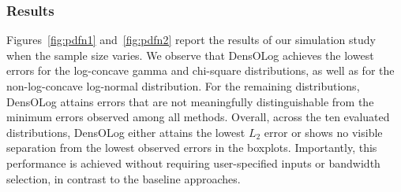 \documentclass[12pt]{article} %
\begin{document}




\subsubsection{Results}
\label{subsec:simresults}




Figures~\ref{fig:pdfn1} and~\ref{fig:pdfn2} report the results of our simulation study when the sample size varies.    %
We observe that DensOLog achieves the lowest errors for the log-concave gamma and chi-square distributions, as well as for the non-log-concave log-normal distribution. For the remaining distributions, DensOLog attains errors that are not meaningfully distinguishable from the minimum errors observed among all methods. Overall, across the ten evaluated distributions, DensOLog either attains the lowest $L_2$ error or shows no visible separation from the lowest observed errors in the boxplots. Importantly, this performance is achieved without requiring user-specified inputs or bandwidth selection, in contrast to the baseline approaches.
\end{document}

